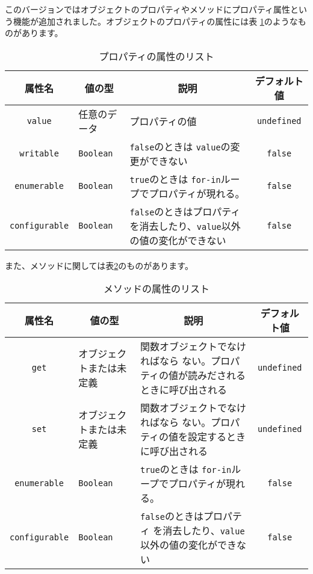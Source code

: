 このバージョンではオブジェクトのプロパティやメソッドにプロパティ属性とい
う機能が追加されました。オブジェクトのプロパティの属性には表
\ref{PropAttribute}のようなものがあります。
\begin{table}[ht]
 \caption{プロパティの属性のリスト}\label{PropAttribute}
\begin{center}
 \begin{tabular}{|c|m{}|m{}|c|}\hline
 属性名 & \multicolumn{1}{c|}{値の型}& \multicolumn{1}{c|}{説明}&
デフォルト値\\\hline
  \texttt{value}& 任意のデータ&プロパティの値&\texttt{undefined}\\ \hline
  \texttt{writable}&\texttt{Boolean}& \texttt{false}のときは
	  \texttt{value}の変更ができない&\texttt{false}\\ \hline
  \texttt{enumerable}&\texttt{Boolean}& \texttt{true}のときは
	  \texttt{for-in}ループでプロパティが現れる。&\texttt{false}\\ \hline
  \texttt{configurable}&\texttt{Boolean}&\texttt{false}のときはプロパティ
	  を消去したり、\texttt{value}以外の値の変化ができない&\texttt{false}\\ \hline
 \end{tabular}
\end{center}
\end{table}
%
また、メソッドに関しては表\ref{MethodAttribute}のものがあります。
\begin{table}[ht]
 \caption{メソッドの属性のリスト}\label{MethodAttribute}
\begin{center}
 \begin{tabular}{|c|m{}|m{}|c|}\hline
 属性名 & \multicolumn{1}{c|}{値の型}& \multicolumn{1}{c|}{説明}& デフォルト値 \\\hline
  \texttt{get}& オブジェクトまたは未定義&関数オブジェクトでなければなら
	  ない。プロパティの値が読みだされるときに呼び出される&\texttt{undefined}\\ \hline
  \texttt{set}&オブジェクトまたは未定義& 関数オブジェクトでなければなら
	  ない。プロパティの値を設定するときに呼び出される&\texttt{undefined}\\ \hline
  \texttt{enumerable}&\texttt{Boolean}& \texttt{true}のときは
	  \texttt{for-in}ループでプロパティが現れる。&\texttt{false}\\ \hline
  \texttt{configurable}&\texttt{Boolean}&\texttt{false}のときはプロパティ
	  を消去したり、\texttt{value}以外の値の変化ができない&\texttt{false}\\ \hline
 \end{tabular}
\end{center}
\end{table}

